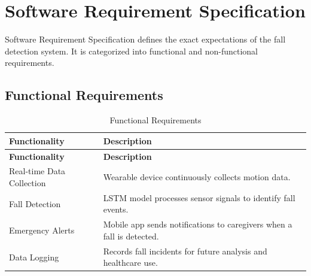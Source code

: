 \documentclass[a4paper, 12pt]{report}
\begin{document}
\section{Software Requirement Specification}
Software Requirement Specification defines the exact expectations of the fall detection system. It is categorized into functional and non-functional requirements.

\subsection{Functional Requirements}
\begin{longtable}{|p{}|p{}|}
    \caption{Functional Requirements}\label{tab:functional_requirements} \\
    
    \hline
    \textbf{Functionality} & \textbf{Description} \\
    \hline
    \endfirsthead

    \hline
    \textbf{Functionality} & \textbf{Description} \\
    \hline
    \endhead

    \hline
    \endfoot

    \hline
    \endlastfoot

    Real-time Data Collection & Wearable device continuously collects motion data. \\
    \hline
    Fall Detection & LSTM model processes sensor signals to identify fall events. \\
    \hline
    Emergency Alerts & Mobile app sends notifications to caregivers when a fall is detected. \\
    \hline
    Data Logging & Records fall incidents for future analysis and healthcare use. \\
\end{longtable}
\end{document}

